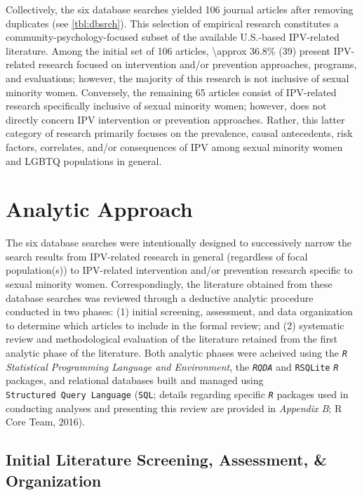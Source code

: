 \documentclass[11pt,]{tufte-book}
\begin{document}
Collectively, the six database searches yielded 106 journal articles
after removing duplicates (see \cref{tbl:dbsrch}). This
selection of empirical research constitutes a
community-psychology-focused subset of the available U.S.-based
IPV-related literature. Among the initial set of 106 articles,
\textbackslash{}approx 36.8\% (39) present IPV-related research focused
on intervention and/or prevention approaches, programs, and evaluations;
however, the majority of this research is not inclusive of sexual
minority women. Conversely, the remaining 65 articles consist of
IPV-related research specifically inclusive of sexual minority women;
however, does not directly concern IPV intervention or prevention
approaches. Rather, this latter category of research primarily focuses
on the prevalence, causal antecedents, risk factors, correlates, and/or
consequences of IPV among sexual minority women and LGBTQ populations in
general.

\chapter{Analytic Approach}\label{analytic-approach}

The six database searches were intentionally designed to successively
narrow the search results from IPV-related research in general
(regardless of focal population(s)) to IPV-related intervention and/or
prevention research specific to sexual minority women. Correspondingly,
the literature obtained from these database searches was reviewed
through a deductive analytic procedure conducted in two phases: (1)
initial screening, assessment, and data organization to determine which
articles to include in the formal review; and (2) systematic review and
methodological evaluation of the literature retained from the first
analytic phase of the literature. Both analytic phases were acheived
using the \emph{\texttt{R} Statistical Programming Language and
Environment}, the \emph{\texttt{RQDA}} and \texttt{RSQLite}
\emph{\texttt{R}} packages, and relational databases built and managed
using \texttt{Structured\ Query\ Language} (\texttt{SQL}; details
regarding specific \emph{\texttt{R}} packages used in conducting
analyses and presenting this review are provided in \emph{Appendix B}; R
Core Team, 2016).

\section{Initial Literature Screening, Assessment, \&
Organization}\label{initial-literature-screening-assessment-organization}
\end{document}
